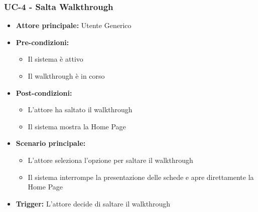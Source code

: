 \documentclass[a4paper,12pt]{article}
\begin{document}
\vspace{0.5cm}

\subsubsection{UC-4 - Salta Walkthrough} \label{subsec:UC-4}
\begin{itemize}
    \item \textbf{Attore principale:} Utente Generico
    
    \item \textbf{Pre-condizioni:}
    \begin{itemize}
        \item Il sistema è attivo
        \item Il walkthrough è in corso
    \end{itemize}
    \item \textbf{Post-condizioni:}
    \begin{itemize}
        \item L'attore ha saltato il walkthrough
        \item Il sistema mostra la Home Page
    \end{itemize}
    \item \textbf{Scenario principale:}
    \begin{itemize}
        \item L'attore seleziona l'opzione per saltare il walkthrough
        \item Il sistema interrompe la presentazione delle schede e apre direttamente la Home Page
    \end{itemize}
    \item \textbf{Trigger:} L'attore decide di saltare il walkthrough
\end{itemize}
\end{document}
